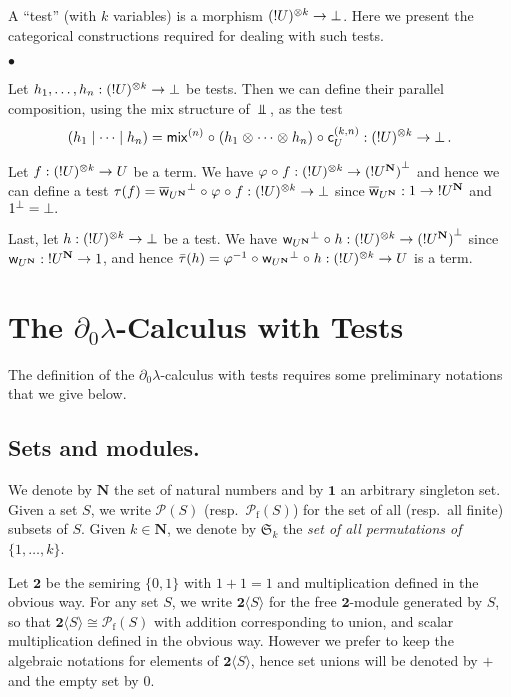 \documentclass{LMCS}
\newcommand{\nat}{\mathbf{N}}
\newcommand{\one}{\mathbf{1}}
\newcommand{\bool}{\mathbf{2}}
\newcommand{\perm}[1]{\mathfrak{S}_{#1}}
\newcommand{\Pow}[1]{\cP(#1)}
\newcommand{\Powf}[1]{\cP_{\mathrm{f}}(#1)}
\newcommand{\dzlam}{\ensuremath{\partial_0\lambda}}
\newcommand{\cP}{\mathcal{P}}
\begin{document}
A ``test'' (with $k$ variables) is a morphism $({\mathord{!}}{U})^{\mathord\otimes k}\to{\mathord{\perp}}$. Here we present the categorical constructions required for dealing
with such tests.
\begin{iteMize}{$\bullet$}
\item Let $h_{1},\dots,h_{n}:({\mathord{!}}{U})^{\mathord\otimes k}\to{\mathord{\perp}}$ be tests. Then we can
  define their parallel composition, using the mix structure of $\Bot$, as the
  test
  \begin{equation*}
    (h_1\mid\cdots\mid h_n)=\mathsf{mix}^{(n)}\mathrel\circ(h_1\mathrel\otimes\cdots\mathrel\otimes h_n)\mathrel\circ\mathsf c_{U}^{(k,n)}:({\mathord{!}}{U})^{\mathord\otimes k}\to{\mathord{\perp}}\,.
  \end{equation*}
\item Let $f:({\mathord{!}}{U})^{\mathord\otimes k}\to U$ be a term. We have $\phi\Comp
  f:\Supertens{(\Excl U)}k\to\Orth{(\Excl{U^\nat})}$ and hence we can define a
  test $\tau(f)=\Orth{\Coweak{U^\nat}}\Comp\phi\Comp f:\Supertens{(\Excl
    U)}k\to\Bot$ since $\Coweak{U^\nat}:\One\to\Excl{U^\nat}$ and
  ${1}^{\mathord{\perp}}={\mathord{\perp}}.$
\item Last, let $h:({\mathord{!}}{U})^{\mathord\otimes k}\to{\mathord{\perp}}$ be a test. We have
  $\Orth{\Weak{U^\nat}}\Comp h:\Supertens{(\Excl U)}k\to\Orth{(\Excl{U^\nat})}$
  since $\Weak{U^\nat}:\Excl{U^\nat}\to\One$, and hence
  $\bar\tau(h)=\Funinv\phi\Comp\Orth{\Weak{U^\nat}}\Comp h:\Supertens{(\Excl
    U)}k\to U$ is a term.
\end{iteMize}

 \section{The \dzlam-Calculus with Tests}\label{sec:dzlam-calculus+tests}


The definition of the \dzlam-calculus with tests requires some preliminary notations that we give below.

\subsection{\bf Sets and modules.}\label{subs:sets} 
We denote by $\nat$ the set of natural numbers and by $\one$ an arbitrary singleton set. Given a set $S$, we write $\Pow{S}$ (resp.\ $\Powf{S}$) for the set of all
 (resp.\ all finite) subsets of $S$. Given $k\in\nat$, we denote by $\perm{k}$ the \emph{set of all permutations of $\{1,\ldots,k\}$}.

Let $\bool$ be the semiring $\{0,1\}$ with $1+1=1$ and multiplication defined in the obvious way. For any set $S$, we write $\bool\langle S \rangle$ for the free
 $\bool$-module generated by $S$, so that $\bool\langle S \rangle\cong\Powf{S}$ with addition corresponding to union, and scalar multiplication defined in the
 obvious way. However we prefer to keep the algebraic notations for elements of $\bool\langle S \rangle$, hence set unions will be denoted by $+$ and the empty set
 by $0$.
\end{document}
